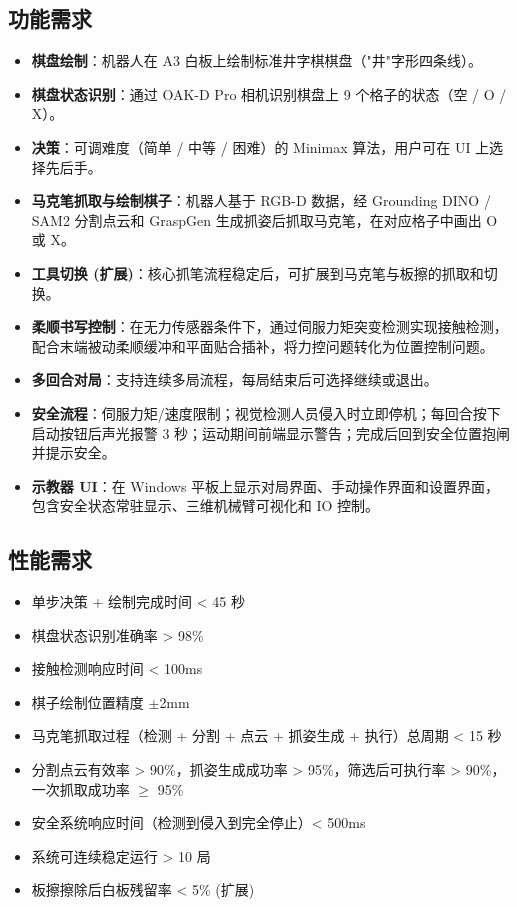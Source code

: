 \documentclass[a4paper, 12pt, oneside]{ctexart}
\begin{document}
\subsection{功能需求}

\begin{itemize}
    \item \textbf{棋盘绘制}：机器人在 A3 白板上绘制标准井字棋棋盘（"井"字形四条线）。
    \item \textbf{棋盘状态识别}：通过 OAK-D Pro 相机识别棋盘上 9 个格子的状态（空 / O / X）。
    \item \textbf{决策}：可调难度（简单 / 中等 / 困难）的 Minimax 算法，用户可在 UI 上选择先后手。
    \item \textbf{马克笔抓取与绘制棋子}：机器人基于 RGB-D 数据，经 Grounding DINO / SAM2 分割点云和 GraspGen 生成抓姿后抓取马克笔，在对应格子中画出 O 或 X。
    \item \textbf{工具切换 (扩展)}：核心抓笔流程稳定后，可扩展到马克笔与板擦的抓取和切换。
    \item \textbf{柔顺书写控制}：在无力传感器条件下，通过伺服力矩突变检测实现接触检测，配合末端被动柔顺缓冲和平面贴合插补，将力控问题转化为位置控制问题。
    \item \textbf{多回合对局}：支持连续多局流程，每局结束后可选择继续或退出。
    \item \textbf{安全流程}：伺服力矩/速度限制；视觉检测人员侵入时立即停机；每回合按下启动按钮后声光报警 3 秒；运动期间前端显示警告；完成后回到安全位置抱闸并提示安全。
    \item \textbf{示教器 UI}：在 Windows 平板上显示对局界面、手动操作界面和设置界面，包含安全状态常驻显示、三维机械臂可视化和 IO 控制。
\end{itemize}

\subsection{性能需求}

\begin{itemize}
    \item 单步决策 + 绘制完成时间 < 45 秒
    \item 棋盘状态识别准确率 > 98\%
    \item 接触检测响应时间 < 100ms
    \item 棋子绘制位置精度 $\pm$2mm
    \item 马克笔抓取过程（检测 + 分割 + 点云 + 抓姿生成 + 执行）总周期 < 15 秒
    \item 分割点云有效率 > 90\%，抓姿生成成功率 > 95\%，筛选后可执行率 > 90\%，一次抓取成功率 $\ge$ 95\%
    \item 安全系统响应时间（检测到侵入到完全停止）< 500ms
    \item 系统可连续稳定运行 > 10 局
    \item 板擦擦除后白板残留率 < 5\% (扩展)
\end{itemize}
\end{document}
